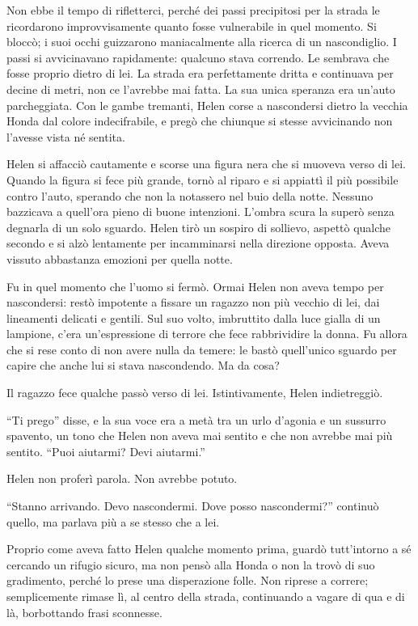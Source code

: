 Non ebbe il tempo di rifletterci, perché dei passi precipitosi per la strada le ricordarono
improvvisamente quanto fosse vulnerabile in quel momento. Si bloccò; i suoi occhi guizzarono
maniacalmente alla ricerca di un nascondiglio. I passi si avvicinavano rapidamente: qualcuno stava
correndo. Le sembrava che fosse proprio dietro di lei. La strada era perfettamente dritta e
continuava per decine di metri, non ce l'avrebbe mai fatta. La sua unica speranza era un'auto
parcheggiata.  Con le gambe tremanti, Helen corse a nascondersi dietro la vecchia Honda dal colore
indecifrabile, e pregò che chiunque si stesse avvicinando non l'avesse vista né sentita.

Helen si affacciò cautamente e scorse una figura nera che si muoveva verso di lei. Quando la figura
si fece più grande, tornò al riparo e si appiattì il più possibile contro l'auto, sperando che non
la notassero nel buio della notte. Nessuno bazzicava a quell'ora pieno di buone intenzioni. L'ombra
scura la superò senza degnarla di un solo sguardo. Helen tirò un sospiro di sollievo, aspettò
qualche secondo e si alzò lentamente per incamminarsi nella direzione opposta. Aveva vissuto
abbastanza emozioni per quella notte.

Fu in quel momento che l'uomo si fermò. Ormai Helen non aveva tempo per nascondersi: restò impotente
a fissare un ragazzo non più vecchio di lei, dai lineamenti delicati e gentili. Sul suo volto,
imbruttito dalla luce gialla di un lampione, c'era un'espressione di terrore che fece rabbrividire
la donna. Fu allora che si rese conto di non avere nulla da temere: le bastò quell'unico sguardo per
capire che anche lui si stava nascondendo. Ma da cosa?

Il ragazzo fece qualche passò verso di lei. Istintivamente, Helen indietreggiò.

``Ti prego'' disse, e la sua voce era a metà tra un urlo d'agonia e un sussurro spavento, un tono
che Helen non aveva mai sentito e che non avrebbe mai più sentito. ``Puoi aiutarmi? Devi aiutarmi.''

Helen non proferì parola. Non avrebbe potuto.

``Stanno arrivando. Devo nascondermi. Dove posso nascondermi?'' continuò quello, ma parlava più a se
stesso che a lei.

Proprio come aveva fatto Helen qualche momento prima, guardò tutt'intorno a sé cercando un rifugio
sicuro, ma non pensò alla Honda o non la trovò di suo gradimento, perché lo prese una disperazione
folle. Non riprese a correre; semplicemente rimase lì, al centro della strada, continuando a vagare
di qua e di là, borbottando frasi sconnesse.

